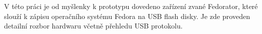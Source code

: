 V této práci je od myšlenky k prototypu dovedeno zařízení zvané Fedorator, které slouží k zápisu operačního systému Fedora na USB flash disky.  Je zde proveden detailní rozbor hardwaru včetně přehledu USB protokolu.
